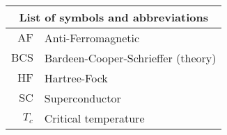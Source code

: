 
	\thispagestyle{plain}
	\begin{table}
		\centering
		\begin{tabular}{r l}
			\multicolumn{2}{c}{\textbf{List of symbols and abbreviations}} \\
			\midrule
			$\mathrm{AF}$ & Anti-Ferromagnetic \\
			$\mathrm{BCS}$ & Bardeen-Cooper-Schrieffer (theory) \\
			$\mathrm{HF}$ & Hartree-Fock \\
			$\mathrm{SC}$ & Superconductor \\
			$T_c$ & Critical temperature \\
		\end{tabular}
	\end{table}
\restoregeometry 
